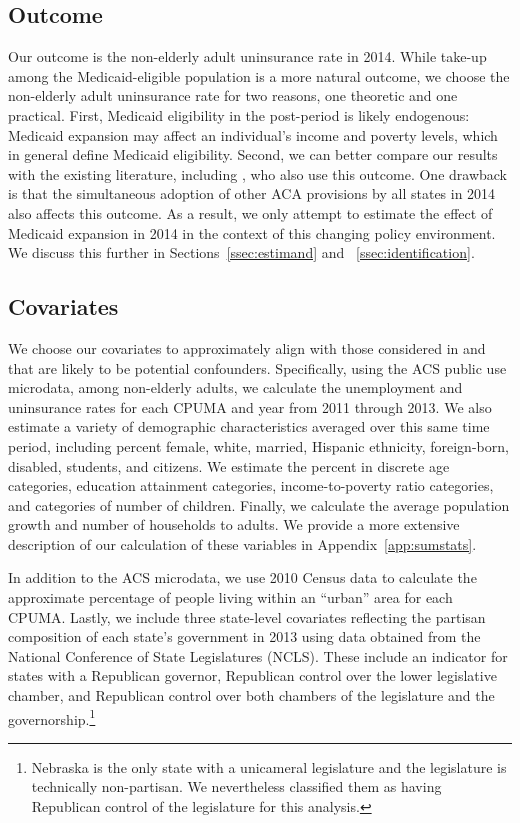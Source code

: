 \documentclass[aoas]{imsart}
\theoremstyle{plain}
\theoremstyle{remark}
\begin{document}
\subsection{Outcome}

Our outcome is the non-elderly adult uninsurance rate in 2014. While take-up among the Medicaid-eligible population is a more natural outcome, we choose the non-elderly adult uninsurance rate for two reasons, one theoretic and one practical. First, Medicaid eligibility in the post-period is likely endogenous: Medicaid expansion may affect an individual's income and poverty levels, which in general define Medicaid eligibility. Second, we can better compare our results with the existing literature, including \cite{courtemanche2017early}, who also use this outcome. One drawback is that the simultaneous adoption of other ACA provisions by all states in 2014 also affects this outcome. As a result, we only attempt to estimate the effect of Medicaid expansion in 2014 in the context of this changing policy environment. We discuss this further in Sections~\ref{ssec:estimand} and ~\ref{ssec:identification}. 

\subsection{Covariates}

We choose our covariates to approximately align with those considered in \cite{courtemanche2017early} and that are likely to be potential confounders. Specifically, using the ACS public use microdata, among non-elderly adults, we calculate the unemployment and uninsurance rates for each CPUMA and year from 2011 through 2013. We also estimate a variety of demographic characteristics averaged over this same time period, including percent female, white, married, Hispanic ethnicity, foreign-born, disabled, students, and citizens. We estimate the percent in discrete age categories, education attainment categories, income-to-poverty ratio categories, and categories of number of children. Finally, we calculate the average population growth and number of households to adults. We provide a more extensive description of our calculation of these variables in Appendix~\ref{app:sumstats}.

In addition to the ACS microdata, we use 2010 Census data to calculate the approximate percentage of people living within an ``urban'' area for each CPUMA. Lastly, we include three state-level covariates reflecting the partisan composition of each state's government in 2013 using data obtained from the National Conference of State Legislatures (NCLS). These include an indicator for states with a Republican governor, Republican control over the lower legislative chamber, and Republican control over both chambers of the legislature and the governorship.\footnote{Nebraska is the only state with a unicameral legislature and the legislature is technically non-partisan. We nevertheless classified them as having Republican control of the legislature for this analysis.} 
\end{document}
